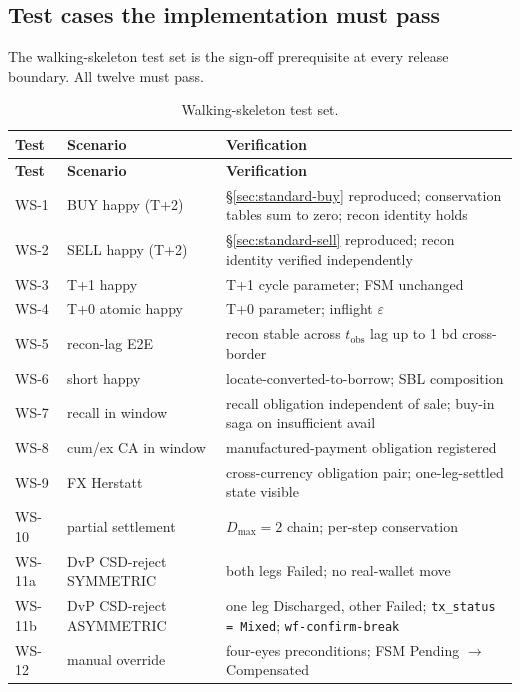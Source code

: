 \documentclass[11pt,a4paper]{article}
\begin{document}
\subsection{Test cases the implementation must pass}
\label{sec:implementation-tests}

The walking-skeleton test set is the sign-off prerequisite at every release boundary. All twelve must pass.

\begin{small}
\begin{longtable}{p{1.6cm}p{6cm}p{6cm}}
\caption{Walking-skeleton test set.}\\
\toprule
\textbf{Test} & \textbf{Scenario} & \textbf{Verification} \\
\midrule
\endfirsthead
\toprule
\textbf{Test} & \textbf{Scenario} & \textbf{Verification} \\
\midrule
\endhead
WS-1   & BUY happy (T+2)             & \S\ref{sec:standard-buy} reproduced; conservation tables sum to zero; recon identity holds \\
WS-2   & SELL happy (T+2)            & \S\ref{sec:standard-sell} reproduced; recon identity verified independently \\
WS-3   & T+1 happy                   & T+1 cycle parameter; FSM unchanged \\
WS-4   & T+0 atomic happy            & T+0 parameter; inflight $\varepsilon$ \\
WS-5   & recon-lag E2E               & recon stable across $t_{\mathrm{obs}}$ lag up to 1 bd cross-border \\
WS-6   & short happy                 & locate-converted-to-borrow; SBL composition \\
WS-7   & recall in window            & recall obligation independent of sale; buy-in saga on insufficient avail \\
WS-8   & cum/ex CA in window         & manufactured-payment obligation registered \\
WS-9   & FX Herstatt                 & cross-currency obligation pair; one-leg-settled state visible \\
WS-10  & partial settlement          & $D_{\max} = 2$ chain; per-step conservation \\
WS-11a & DvP CSD-reject SYMMETRIC    & both legs Failed; no real-wallet move \\
WS-11b & DvP CSD-reject ASYMMETRIC   & one leg Discharged, other Failed; \texttt{tx\_status = Mixed}; \texttt{wf-confirm-break} \\
WS-12  & manual override             & four-eyes preconditions; FSM Pending $\to$ Compensated \\
\bottomrule
\end{longtable}
\end{small}
\end{document}

